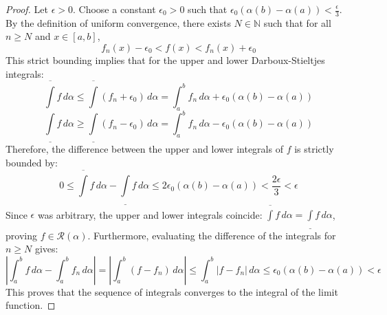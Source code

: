 \begin{proof}
Let $\epsilon > 0$. Choose a constant $\epsilon_0 > 0$ such that $\epsilon_0 (\alpha(b) - \alpha(a)) < \frac{\epsilon}{3}$. By the definition of uniform convergence, there exists $N \in \mathbb{N}$ such that for all $n \ge N$ and $x \in [a, b]$,
\[
f_n(x) - \epsilon_0 < f(x) < f_n(x) + \epsilon_0
\]
This strict bounding implies that for the upper and lower Darboux-Stieltjes integrals:
\[
\overline{\int} f \, d\alpha \le \overline{\int} (f_n + \epsilon_0) \, d\alpha = \int_a^b f_n \, d\alpha + \epsilon_0 (\alpha(b) - \alpha(a))
\]
\[
\underline{\int} f \, d\alpha \ge \underline{\int} (f_n - \epsilon_0) \, d\alpha = \int_a^b f_n \, d\alpha - \epsilon_0 (\alpha(b) - \alpha(a))
\]
Therefore, the difference between the upper and lower integrals of $f$ is strictly bounded by:
\[
0 \le \overline{\int} f \, d\alpha - \underline{\int} f \, d\alpha \le 2\epsilon_0 (\alpha(b) - \alpha(a)) < \frac{2\epsilon}{3} < \epsilon
\]
Since $\epsilon$ was arbitrary, the upper and lower integrals coincide: $\overline{\int} f \, d\alpha = \underline{\int} f \, d\alpha$, proving $f \in \mathcal{R}(\alpha)$. Furthermore, evaluating the difference of the integrals for $n \ge N$ gives:
\[
\left| \int_a^b f \, d\alpha - \int_a^b f_n \, d\alpha \right| = \left| \int_a^b (f - f_n) \, d\alpha \right| \le \int_a^b |f - f_n| \, d\alpha \le \epsilon_0 (\alpha(b) - \alpha(a)) < \epsilon
\]
This proves that the sequence of integrals converges to the integral of the limit function.
\end{proof}